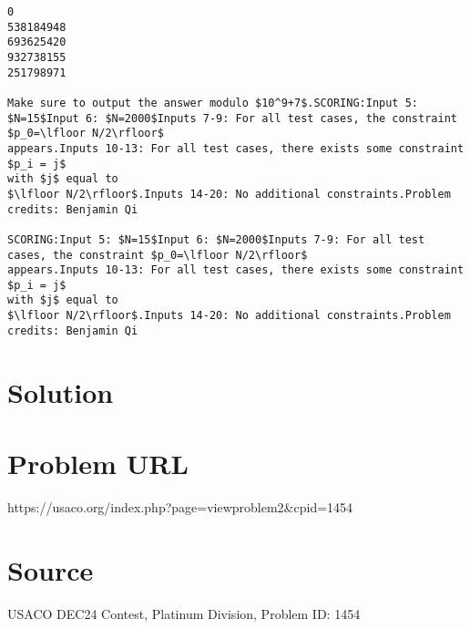 \documentclass[12pt]{article}
\begin{document}
\begin{verbatim}
0
538184948
693625420
932738155
251798971

Make sure to output the answer modulo $10^9+7$.SCORING:Input 5: $N=15$Input 6: $N=2000$Inputs 7-9: For all test cases, the constraint $p_0=\lfloor N/2\rfloor$
appears.Inputs 10-13: For all test cases, there exists some constraint $p_i = j$
with $j$ equal to
$\lfloor N/2\rfloor$.Inputs 14-20: No additional constraints.Problem credits: Benjamin Qi

SCORING:Input 5: $N=15$Input 6: $N=2000$Inputs 7-9: For all test cases, the constraint $p_0=\lfloor N/2\rfloor$
appears.Inputs 10-13: For all test cases, there exists some constraint $p_i = j$
with $j$ equal to
$\lfloor N/2\rfloor$.Inputs 14-20: No additional constraints.Problem credits: Benjamin Qi
\end{verbatim}

\section*{Solution}


\section*{Problem URL}
https://usaco.org/index.php?page=viewproblem2&cpid=1454

\section*{Source}
USACO DEC24 Contest, Platinum Division, Problem ID: 1454
\end{document}
